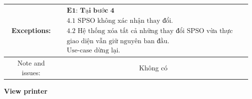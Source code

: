 \begin{tabular}{|c|c|c|c|}
\hline Exceptions: & \multicolumn{3}{|c|}{$\begin{array}{l}
\textbf { E1: Tại bước 4 } \\
\text { 4.1 SPSO không xác nhận thay đổi.} \\
\text { 4.2 Hệ thống xóa tất cả những thay đổi SPSO vừa thực hiện,} \\
\text { giao diện vẫn giữ nguyên ban đầu.} \\
\text { Use-case dừng lại.} 
\text {}\end{array}$} \\
\hline Note and issues: & \multicolumn{3}{|c|}{ Không có } \\
\hline
\end{tabular}

\vspace{1cm}
\textbf{View printer}\par
